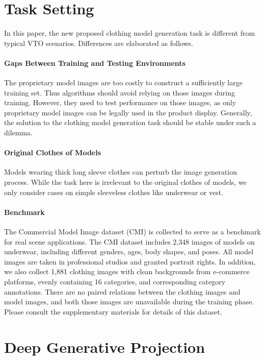 \documentclass[10pt,twocolumn,letterpaper]{article}
\begin{document}
\section{Task Setting}\label{sec:task}
In this paper, the new proposed clothing model generation task is different from typical VTO scenarios. Differences are elaborated as follows.
\paragraph{Gaps Between Training and Testing Environments} The proprietary model images are too costly to construct a sufficiently large training set. Thus algorithms should avoid relying on those images during training. However, they need to test performance on those images, as only proprietary model images can be legally used in the product display. Generally, the solution to the clothing model generation task should be stable under such a dilemma.

\paragraph{Original Clothes of Models} Models wearing thick long sleeve clothes can perturb the image generation process. While the task here is irrelevant to the original clothes of models, we only consider cases on simple sleeveless clothes like underwear or vest.

\paragraph{Benchmark} The Commercial Model Image dataset (CMI) is collected to serve as a benchmark for real scene applications. The CMI dataset includes 2,348 images of models on underwear, including different genders, ages, body shapes, and poses. All model images are taken in professional studios and granted portrait rights.
In addition, we also collect 1,881 clothing images with clean backgrounds from e-commerce platforms, evenly containing 16 categories, and corresponding category annotations. There are no paired relations between the clothing images and model images, and both those images are unavailable during the training phase. Please consult the supplementary materials for details of this dataset.

\section{Deep Generative Projection}
\end{document}
